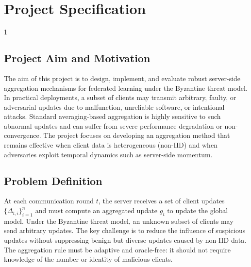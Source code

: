 \doublespacing %

\chapter{Project Specification}
\label{chSpec}

\begin{spacing}{1} %
\minitoc %
\end{spacing} %
\thesisspacing %

\section{Project Aim and Motivation}
The aim of this project is to design, implement, and evaluate robust server-side aggregation mechanisms for federated learning under the Byzantine threat model. In practical deployments, a subset of clients may transmit arbitrary, faulty, or adversarial updates due to malfunction, unreliable software, or intentional attacks. Standard averaging-based aggregation is highly sensitive to such abnormal updates and can suffer from severe performance degradation or non-convergence. The project focuses on developing an aggregation method that remains effective when client data is heterogeneous (non-IID) and when adversaries exploit temporal dynamics such as server-side momentum.

\section{Problem Definition}
At each communication round $t$, the server receives a set of client updates $\{\Delta_{t,i}\}_{i=1}^{n}$ and must compute an aggregated update $g_t$ to update the global model. Under the Byzantine threat model, an unknown subset of clients may send arbitrary updates. The key challenge is to reduce the influence of suspicious updates without suppressing benign but diverse updates caused by non-IID data. The aggregation rule must be adaptive and oracle-free: it should not require knowledge of the number or identity of malicious clients.


